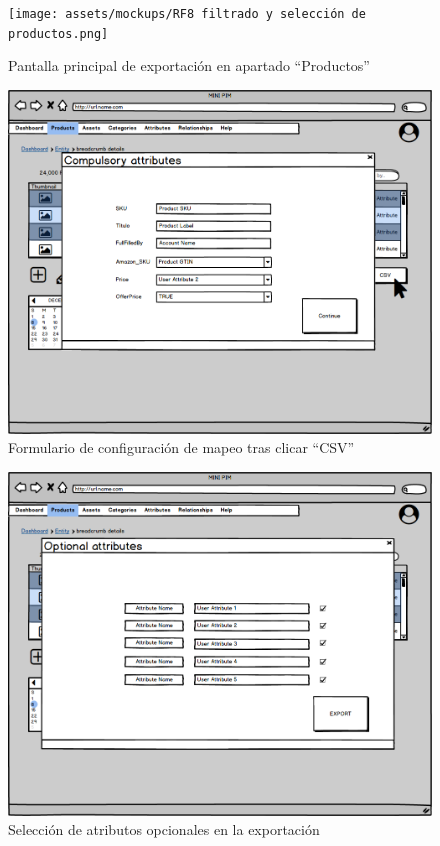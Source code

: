 \begin{figure}[H]
    \texttt{[image: assets/mockups/RF8 filtrado y selección de productos.png]}
    \caption{Pantalla principal de exportación en apartado \enquote{Productos}}
\end{figure}


\begin{figure}[H]
    \includegraphics[width=1\linewidth]{assets/mockups/RF8 Seleccion de atributos obligatorios.png}
    \caption{Formulario de configuración de mapeo tras clicar \enquote{CSV}}
\end{figure}

\begin{figure}[H]
    \includegraphics[width=1\linewidth]{assets/mockups/RF8 Seleccion atributos opcionales.png}
    \caption{Selección de atributos opcionales en la exportación}
\end{figure}

